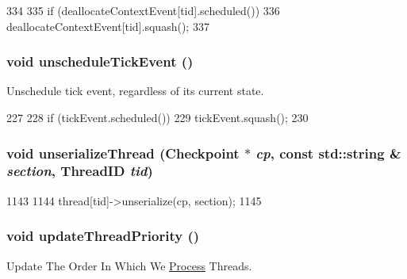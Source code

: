 \begin{DoxyCode}
334     {
335         if (deallocateContextEvent[tid].scheduled())
336             deallocateContextEvent[tid].squash();
337     }
\end{DoxyCode}
\hypertarget{classFullO3CPU_ad819e7898bd94721d107a35fde764390}{
\subsubsection[{unscheduleTickEvent}]{\setlength{\rightskip}{0pt plus 5cm}void unscheduleTickEvent ()}}
\label{classFullO3CPU_ad819e7898bd94721d107a35fde764390}
Unschedule tick event, regardless of its current state. 


\begin{DoxyCode}
227     {
228         if (tickEvent.scheduled())
229             tickEvent.squash();
230     }
\end{DoxyCode}
\hypertarget{classFullO3CPU_a5122e6d6fdbdb3cb9ba72ae970f00a9e}{
\subsubsection[{unserializeThread}]{\setlength{\rightskip}{0pt plus 5cm}void unserializeThread ({\bf Checkpoint} $\ast$ {\em cp}, \/  const std::string \& {\em section}, \/  {\bf ThreadID} {\em tid})}}
\label{classFullO3CPU_a5122e6d6fdbdb3cb9ba72ae970f00a9e}



\begin{DoxyCode}
1143 {
1144     thread[tid]->unserialize(cp, section);
1145 }
\end{DoxyCode}
\hypertarget{classFullO3CPU_a00247488696e6ff608a2a44673578094}{
\subsubsection[{updateThreadPriority}]{\setlength{\rightskip}{0pt plus 5cm}void updateThreadPriority ()}}
\label{classFullO3CPU_a00247488696e6ff608a2a44673578094}
Update The Order In Which We \hyperlink{classProcess}{Process} Threads. 


